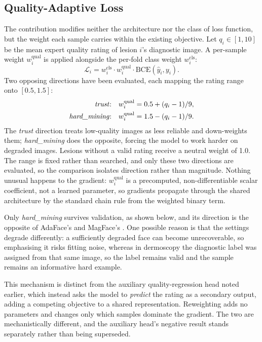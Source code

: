 \documentclass[conference]{IEEEtran}
\begin{document}
\subsection{Quality-Adaptive Loss}
\label{sec:qaloss}
The contribution modifies neither the architecture nor the class of loss function, but the weight each sample carries within the existing objective. Let $q_i \in [1,10]$ be the mean expert quality rating of lesion $i$'s diagnostic image. A per-sample weight $w_i^{\mathrm{qual}}$ is applied alongside the per-fold class weight $w_i^{\mathrm{cls}}$:
\begin{equation}
\mathcal{L}_i = w_i^{\mathrm{cls}} \cdot w_i^{\mathrm{qual}} \cdot \mathrm{BCE}(\hat{y}_i, y_i).
\end{equation}
Two opposing directions have been evaluated, each mapping the rating range onto $[0.5, 1.5]$:
\begin{align}
\text{\emph{trust}:}\quad & w_i^{\mathrm{qual}} = 0.5 + (q_i - 1)/9, \\
\text{\emph{hard\_mining}:}\quad & w_i^{\mathrm{qual}} = 1.5 - (q_i - 1)/9.
\end{align}
The \emph{trust} direction treats low-quality images as less reliable and down-weights them; \emph{hard\_mining} does the opposite, forcing the model to work harder on degraded images. Lesions without a valid rating receive a neutral weight of 1.0. The range is fixed rather than searched, and only these two directions are evaluated, so the comparison isolates direction rather than magnitude. Nothing unusual happens to the gradient: $w_i^{\mathrm{qual}}$ is a precomputed, non-differentiable scalar coefficient, not a learned parameter, so gradients propagate through the shared architecture by the standard chain rule from the weighted binary term.

Only \emph{hard\_mining} survives validation, as shown below, and its direction is the opposite of AdaFace's and MagFace's \cite{adaface,magface}. One possible reason is that the settings degrade differently: a sufficiently degraded face can become unrecoverable, so emphasising it risks fitting noise, whereas in dermoscopy the diagnostic label was assigned from that same image, so the label remains valid and the sample remains an informative hard example.

This mechanism is distinct from the auxiliary quality-regression head noted earlier, which instead asks the model to \emph{predict} the rating as a secondary output, adding a competing objective to a shared representation. Reweighting adds no parameters and changes only which samples dominate the gradient. The two are mechanistically different, and the auxiliary head's negative result stands separately rather than being superseded.
\end{document}
